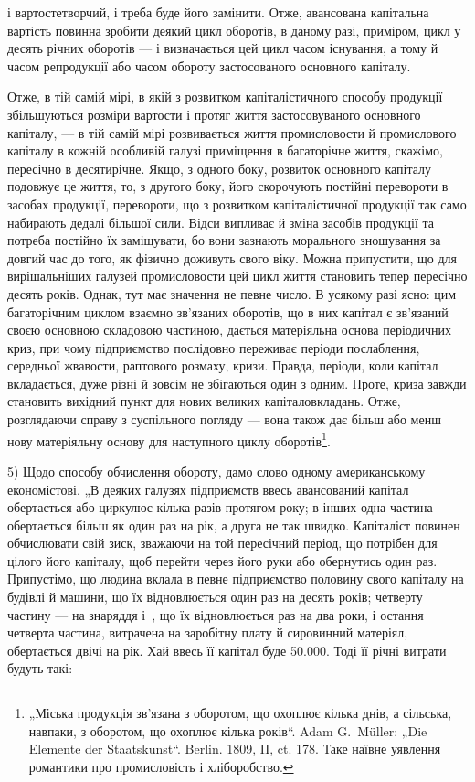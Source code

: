\parcont{}  %
і вартостетворчий, і треба буде його замінити. Отже, авансована капітальна
вартість повинна зробити деякий цикл оборотів, в даному разі, приміром, цикл
у десять річних оборотів — і визначається цей цикл часом існування,
а тому й часом репродукції або часом обороту застосованого основного
капіталу.

Отже, в тій самій мірі, в якій з розвитком капіталістичного способу
продукції збільшуються розміри вартости і протяг життя застосовуваного
основного капіталу, — в тій самій мірі розвивається життя промисловости
й промислового капіталу в кожній особливій галузі приміщення в багаторічне
життя, скажімо, пересічно в десятирічне. Якщо, з одного боку,
розвиток основного капіталу подовжує це життя, то, з другого боку,
його скорочують постійні перевороти в засобах продукції, перевороти,
що з розвитком капіталістичної продукції так само набирають дедалі
більшої сили. Відси випливає й зміна засобів продукції та потреба постійно
їх заміщувати, бо вони зазнають морального зношування за довгий
час до того, як фізично доживуть свого віку. Можна припустити, що
для вирішальніших галузей промисловости цей цикл життя становить тепер
пересічно десять років. Однак, тут має значення не певне число. В усякому
разі ясно: цим багаторічним циклом взаємно зв’язаних оборотів, що
в них капітал є зв’язаний своєю основною складовою частиною, дається
матеріяльна основа періодичних криз, при чому підприємство послідовно
переживає періоди послаблення, середньої жвавости, раптового розмаху,
кризи. Правда, періоди, коли капітал вкладається, дуже різні й зовсім не
збігаються один з одним. Проте, криза завжди становить вихідний пункт
для нових великих капіталовкладань. Отже, розглядаючи справу з суспільного
погляду — вона також дає більш або менш нову матеріяльну
основу для наступного циклу оборотів\footnote{
„Міська продукція зв’язана з оборотом, що охоплює кілька днів, а сільська,
навпаки, з оборотом, що охоплює кілька років“. Adam G.~Müller: „Die Elemente
der Staatskunst“. Berlin. 1809, II, ct. 178. Таке наївне уявлення романтики
про промисловість і хліборобство.
}.

5) Щодо способу обчислення обороту, дамо слово одному американському
економістові. „В деяких галузях підприємств ввесь авансований
капітал обертається або циркулює кілька разів протягом року; в інших
одна частина обертається більш як один раз на рік, а друга не так швидко.
Капіталіст повинен обчислювати свій зиск, зважаючи на той пересічний
період, що потрібен для цілого його капіталу, щоб перейти через його
руки або обернутись один раз. Припустімо, що людина вклала в певне
підприємство половину свого капіталу на будівлі й машини, що їх відновлюється
один раз на десять років; четверту частину — на знаряддя і~,
що їх відновлюється раз на два роки, і остання четверта частина, витрачена
на заробітну плату й сировинний матеріял, обертається двічі на рік.
Хай ввесь її капітал буде \num{50.000}. Тоді її річні витрати будуть
такі:
